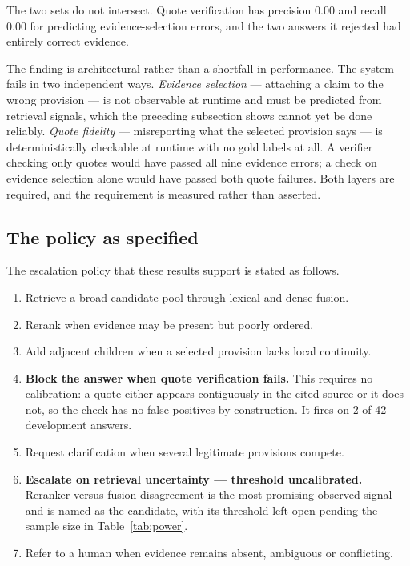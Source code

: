 The two sets do not intersect. Quote verification has precision 0.00 and recall
0.00 for predicting evidence-selection errors, and the two answers it rejected had
entirely correct evidence.

The finding is architectural rather than a shortfall in performance. The system fails in two
independent ways. \emph{Evidence selection} --- attaching a claim to the wrong
provision --- is not observable at runtime and must be predicted from retrieval
signals, which the preceding subsection shows cannot yet be done reliably.
\emph{Quote fidelity} --- misreporting what the selected provision says --- is
deterministically checkable at runtime with no gold labels at all. A verifier
checking only quotes would have passed all nine evidence errors; a check on
evidence selection alone would have passed both quote failures. Both layers are
required, and the requirement is measured rather than asserted.

\subsection{The policy as specified}

The escalation policy that these results support is stated as follows.

\begin{enumerate}
  \item Retrieve a broad candidate pool through lexical and dense fusion.
  \item Rerank when evidence may be present but poorly ordered.
  \item Add adjacent children when a selected provision lacks local continuity.
  \item \textbf{Block the answer when quote verification fails.} This requires no
    calibration: a quote either appears contiguously in the cited source or it
    does not, so the check has no false positives by construction. It fires on 2
    of 42 development answers.
  \item Request clarification when several legitimate provisions compete.
  \item \textbf{Escalate on retrieval uncertainty --- threshold uncalibrated.}
    Reranker-versus-fusion disagreement is the most promising observed signal and
    is named as the candidate, with its threshold left open pending the sample
    size in Table~\ref{tab:power}.
  \item Refer to a human when evidence remains absent, ambiguous or conflicting.
\end{enumerate}

